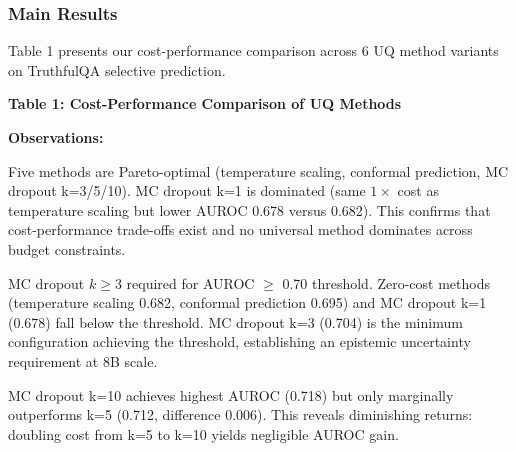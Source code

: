 
\subsubsection{Main Results}

Table 1 presents our cost-performance comparison across 6 UQ method variants on TruthfulQA selective prediction.

\textbf{Table 1: Cost-Performance Comparison of UQ Methods}

\begin{table}[htbp]
\centering
{}
\end{table}

\textbf{Observations:}

Five methods are Pareto-optimal (temperature scaling, conformal prediction, MC dropout k=3/5/10). MC dropout k=1 is dominated (same $1\times$ cost as temperature scaling but lower AUROC 0.678 versus 0.682). This confirms that cost-performance trade-offs exist and no universal method dominates across budget constraints.

MC dropout $k\geq 3$ required for AUROC $\geq$ 0.70 threshold. Zero-cost methods (temperature scaling 0.682, conformal prediction 0.695) and MC dropout k=1 (0.678) fall below the threshold. MC dropout k=3 (0.704) is the minimum configuration achieving the threshold, establishing an epistemic uncertainty requirement at 8B scale.

MC dropout k=10 achieves highest AUROC (0.718) but only marginally outperforms k=5 (0.712, difference 0.006). This reveals diminishing returns: doubling cost from k=5 to k=10 yields negligible AUROC gain.


